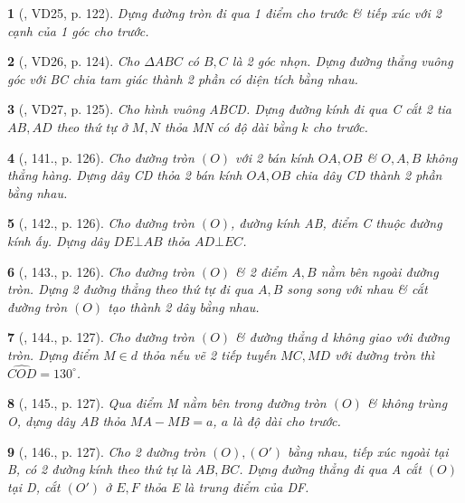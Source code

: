 \documentclass{article}
\newtheorem{baitoan}{}
\begin{document}
\begin{baitoan}[\cite{Binh_Toan_9_tap_1}, VD25, p. 122]
	Dựng đường tròn đi qua 1 điểm cho trước \& tiếp xúc với 2 cạnh của 1 góc cho trước.
\end{baitoan}

\begin{baitoan}[\cite{Binh_Toan_9_tap_1}, VD26, p. 124]
	Cho $\Delta ABC$ có $B,C$ là 2 góc nhọn. Dựng đường thẳng vuông góc với BC chia tam giác thành 2 phần có diện tích bằng nhau.
\end{baitoan}

\begin{baitoan}[\cite{Binh_Toan_9_tap_1}, VD27, p. 125]
	Cho hình vuông ABCD. Dựng đường kính đi qua C cắt 2 tia $AB,AD$ theo thứ tự ở $M,N$ thỏa MN có độ dài bằng $k$ cho trước.
\end{baitoan}

\begin{baitoan}[\cite{Binh_Toan_9_tap_1}, 141., p. 126]
	Cho đường tròn $(O)$ với 2 bán kính $OA,OB$ \& $O,A,B$ không thẳng hàng. Dựng dây CD thỏa 2 bán kính $OA,OB$ chia dây CD thành 2 phần bằng nhau.
\end{baitoan}

\begin{baitoan}[\cite{Binh_Toan_9_tap_1}, 142., p. 126]
	Cho đường tròn $(O)$, đường kính AB, điểm C thuộc đường kính ấy. Dựng dây $DE\bot AB$ thỏa $AD\bot EC$.
\end{baitoan}

\begin{baitoan}[\cite{Binh_Toan_9_tap_1}, 143., p. 126]
	Cho đường tròn $(O)$ \& 2 điểm $A,B$ nằm bên ngoài đường tròn. Dựng 2 đường thẳng theo thứ tự đi qua $A,B$ song song với nhau \& cắt đường tròn $(O)$ tạo thành 2 dây bằng nhau.
\end{baitoan}

\begin{baitoan}[\cite{Binh_Toan_9_tap_1}, 144., p. 127]
	Cho đường tròn $(O)$ \& đường thẳng $d$ không giao với đường tròn. Dựng điểm $M\in d$ thỏa nếu vẽ 2 tiếp tuyến $MC,MD$ với đường tròn thì $\widehat{COD} = 130^\circ$.
\end{baitoan}

\begin{baitoan}[\cite{Binh_Toan_9_tap_1}, 145., p. 127]
	Qua điểm M nằm bên trong đường tròn $(O)$ \& không trùng O, dựng dây AB thỏa $MA - MB = a$, $a$ là độ dài cho trước.
\end{baitoan}

\begin{baitoan}[\cite{Binh_Toan_9_tap_1}, 146., p. 127]
	Cho 2 đường tròn $(O),(O')$ bằng nhau, tiếp xúc ngoài tại B, có 2 đường kính theo thứ tự là $AB,BC$. Dựng đường thẳng đi qua A cắt $(O)$ tại D, cắt $(O')$ ở $E,F$ thỏa E là trung điểm của DF.
\end{baitoan}
\end{document}
